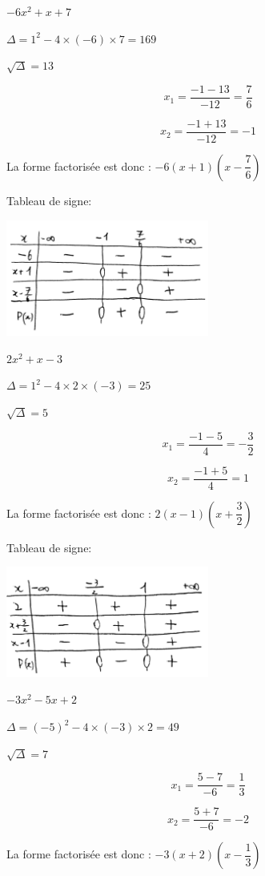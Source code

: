 \documentclass[a4paper,12pt]{scrartcl}
\begin{document}
\question{}%
$-6x^2 + x + 7$

$\Delta = 1^2 - 4 \times (-6) \times 7 = 169$

$\sqrt{\Delta} = 13$

$$x_1 = \dfrac{-1-13}{-12} = \dfrac{7}{6}$$

$$x_2 = \dfrac{-1+13}{-12} = -1$$

La forme factorisée est donc : $-6 \left(x + 1\right)\left(x - \dfrac{7}{6} \right)$

Tableau de signe:

\includegraphics[width=0.5\textwidth]{pics/2.png}

\question{}%
$2x^2 + x - 3$

$\Delta = 1^2 - 4 \times 2 \times (-3) = 25$

$\sqrt{\Delta} = 5$

$$x_1 = \dfrac{-1-5}{4} = -\dfrac{3}{2}$$

$$x_2 = \dfrac{-1+5}{4} = 1$$

La forme factorisée est donc : $2 \left(x - 1\right)\left(x + \dfrac{3}{2} \right)$

Tableau de signe:

\includegraphics[width=0.5\textwidth]{pics/3.png}

\question{}%
$-3x^2 -5x +2$

$\Delta = (-5)^2 - 4 \times (-3) \times 2 = 49$

$\sqrt{\Delta} = 7$

$$x_1 = \dfrac{5-7}{-6} = \dfrac{1}{3}$$

$$x_2 = \dfrac{5+7}{-6} = -2$$

La forme factorisée est donc : $-3 \left(x + 2\right)\left(x - \dfrac{1}{3} \right)$
\end{document}
